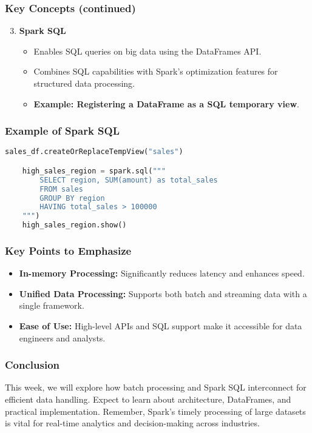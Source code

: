 \documentclass[aspectratio=169]{beamer}
\begin{document}
\begin{frame}[fragile]
    \frametitle{Key Concepts (continued)}
    \begin{enumerate}
        \setcounter{enumi}{2}
        \item \textbf{Spark SQL}
        \begin{itemize}
            \item Enables SQL queries on big data using the DataFrames API.
            \item Combines SQL capabilities with Spark's optimization features for structured data processing.
            \item \textbf{Example: Registering a DataFrame as a SQL temporary view}.
        \end{itemize}
    \end{enumerate}
\end{frame}

\begin{frame}[fragile]
    \frametitle{Example of Spark SQL}
    \begin{lstlisting}[language=Python]
    sales_df.createOrReplaceTempView("sales")

    high_sales_region = spark.sql("""
        SELECT region, SUM(amount) as total_sales 
        FROM sales 
        GROUP BY region 
        HAVING total_sales > 100000
    """)
    high_sales_region.show()
    \end{lstlisting}
\end{frame}

\begin{frame}[fragile]
    \frametitle{Key Points to Emphasize}
    \begin{itemize}
        \item \textbf{In-memory Processing:} Significantly reduces latency and enhances speed.
        \item \textbf{Unified Data Processing:} Supports both batch and streaming data with a single framework.
        \item \textbf{Ease of Use:} High-level APIs and SQL support make it accessible for data engineers and analysts.
    \end{itemize}
\end{frame}

\begin{frame}[fragile]
    \frametitle{Conclusion}
    This week, we will explore how batch processing and Spark SQL interconnect for efficient data handling. Expect to learn about architecture, DataFrames, and practical implementation. Remember, Spark's timely processing of large datasets is vital for real-time analytics and decision-making across industries.
\end{frame}
\end{document}
